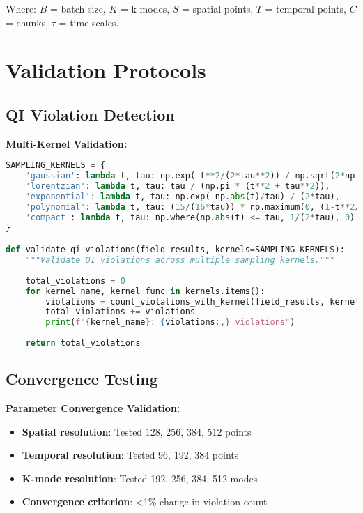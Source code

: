\documentclass[11pt]{article}
\begin{document}
Where: $B$ = batch size, $K$ = k-modes, $S$ = spatial points, $T$ = temporal points, $C$ = chunks, $\tau$ = time scales.

\section{Validation Protocols}

\subsection{QI Violation Detection}

\textbf{Multi-Kernel Validation:}
\begin{lstlisting}[language=Python]
SAMPLING_KERNELS = {
    'gaussian': lambda t, tau: np.exp(-t**2/(2*tau**2)) / np.sqrt(2*np.pi*tau**2),
    'lorentzian': lambda t, tau: tau / (np.pi * (t**2 + tau**2)),
    'exponential': lambda t, tau: np.exp(-np.abs(t)/tau) / (2*tau),
    'polynomial': lambda t, tau: (15/(16*tau)) * np.maximum(0, (1-t**2/tau**2)**2),
    'compact': lambda t, tau: np.where(np.abs(t) <= tau, 1/(2*tau), 0)
}

def validate_qi_violations(field_results, kernels=SAMPLING_KERNELS):
    """Validate QI violations across multiple sampling kernels."""
    
    total_violations = 0
    for kernel_name, kernel_func in kernels.items():
        violations = count_violations_with_kernel(field_results, kernel_func)
        total_violations += violations
        print(f"{kernel_name}: {violations:,} violations")
    
    return total_violations
\end{lstlisting}

\subsection{Convergence Testing}

\textbf{Parameter Convergence Validation:}
\begin{itemize}
    \item \textbf{Spatial resolution}: Tested 128, 256, 384, 512 points
    \item \textbf{Temporal resolution}: Tested 96, 192, 384 points  
    \item \textbf{K-mode resolution}: Tested 192, 256, 384, 512 modes
    \item \textbf{Convergence criterion}: <1\% change in violation count
\end{itemize}
\end{document}
